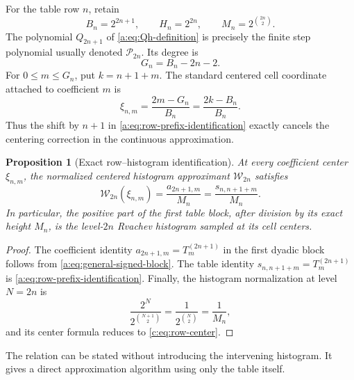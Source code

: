 \documentclass[11pt,a4paper,oneside,openany]{book}
\numberwithin{equation}{chapter}
\newtheorem{proposition}[theorem]{Proposition}
\theoremstyle{definition}
\theoremstyle{remark}
\newcommand{\A}{Q}
\begin{document}
For the table row \(n\), retain
\begin{equation}
 B_n=2^{2n+1},\qquad H_n=2^{2n},\qquad
 M_n=2^{\binom{2n}{2}}.                                   \label{c:eq:BHM-row}
\end{equation}
The polynomial \(\A_{2n+1}\) of \cref{a:eq:Qh-definition} is precisely the finite
step polynomial usually denoted \(\mathcal P_{2n}\).  Its degree is
\begin{equation}
 G_n=B_n-2n-2.                                             \label{c:eq:Gn}
\end{equation}
For \(0\leq m\leq G_n\), put \(k=n+1+m\).  The standard centered cell
coordinate attached to coefficient \(m\) is
\begin{equation}
 \xi_{n,m}=\frac{2m-G_n}{B_n}
           =\frac{2k-B_n}{B_n}.                           \label{c:eq:row-center}
\end{equation}
Thus the shift by \(n+1\) in \cref{a:eq:row-prefix-identification} exactly cancels the
centering correction in the continuous approximation.

\begin{proposition}[Exact row--histogram identification]
\label{c:prop:row-histogram}
At every coefficient center \(\xi_{n,m}\), the normalized centered
histogram approximant \(\mathcal W_{2n}\) satisfies
\begin{equation}
 \mathcal W_{2n}(\xi_{n,m})
 =\frac{a_{2n+1,m}}{M_n}
 =\frac{s_{n,n+1+m}}{M_n}.                                \label{c:eq:row-histogram}
\end{equation}
In particular, the positive part of the first table block, after division
by its exact height \(M_n\), is the level-\(2n\) Rvachev histogram sampled
at its cell centers.
\end{proposition}

\begin{proof}
The coefficient identity
\(a_{2n+1,m}=T_{m}^{(2n+1)}\) in the first dyadic block follows from
\cref{a:eq:general-signed-block}.  The table identity
\(s_{n,n+1+m}=T_{m}^{(2n+1)}\) is \cref{a:eq:row-prefix-identification}.  Finally, the
histogram normalization at level \(N=2n\) is
\[
 \frac{2^{N}}{2^{\binom{N+1}{2}}}
 =\frac1{2^{\binom N2}}=\frac1{M_n},
\]
and its center formula reduces to \cref{c:eq:row-center}.
\end{proof}

The relation can be stated without introducing the intervening histogram.
It gives a direct approximation algorithm using only the table itself.
\end{document}
